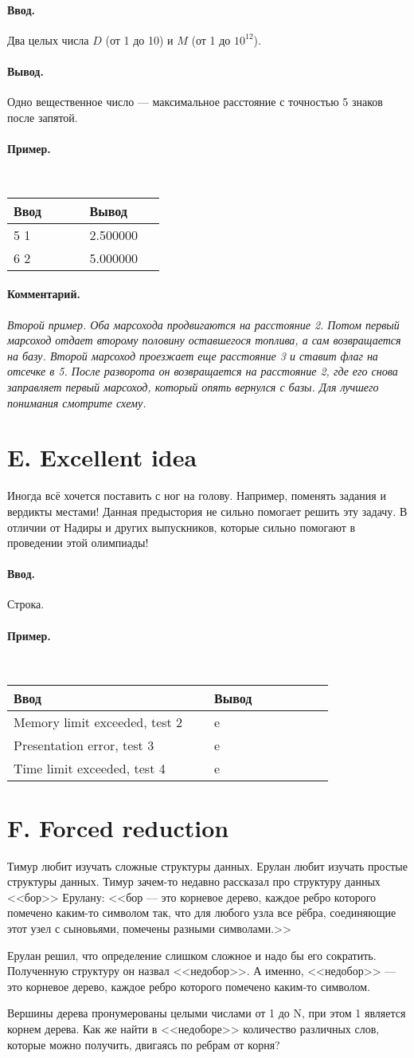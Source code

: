 \documentclass[10pt, a5paper]{article}
\newcommand{\informat}[1]
{
	\paragraph{Ввод.\\} #1
}
\newcommand{\outformat}[1]
{
	\paragraph{Вывод.\\} #1
}
\newcommand{\examplee}[4]
{
	\paragraph{Пример.\\}
	{\tt
	\begin{tabular}{|p{0.4\linewidth}|p{0.4\linewidth}|}
	\hline
	Ввод 	& Вывод  	\\
	\hline
	#1 		& #2 		\\
	\hline
	#3		& #4		\\
	\hline
	\end{tabular}
	}
}
\newcommand{\examplEEE}[6]
{
	\paragraph{Пример.\\}
	{\tt
	\begin{tabular}{|p{0.5\linewidth}|p{0.3\linewidth}|}
	\hline
	Ввод 	& Вывод  	\\
	\hline
	#1 		& #2 		\\
	\hline
	#3		& #4		\\
	\hline
	#5		& #6		\\
	\hline
	\end{tabular}
	}
}
\newcommand{\excomm}[1]
{
	\paragraph{Комментарий. \\}
	\textit{#1}
}
\begin{document}
\informat{Два целых числа $D$ (от 1 до 10) и $M$ (от 1 до $10^{12}$).}

\outformat{Одно вещественное число --- максимальное расстояние с точностью 5 знаков после запятой.}

\examplee{5 1}{2.500000}{6 2}{5.000000}

\excomm{Второй пример. Оба марсохода продвигаются на расстояние 2. Потом первый марсоход отдает второму половину оставшегося топлива, а сам возвращается на базу. Второй марсоход проезжает еще расстояние 3 и ставит флаг на отсечке в 5. После разворота он возвращается на расстояние 2, где его снова заправляет первый марсоход, который опять вернулся с базы. Для лучшего понимания смотрите схему.}





\section*{E. Excellent idea}
 


Иногда всё хочется поставить с ног на голову. Например, поменять задания и вердикты местами! Данная предыстория не сильно помогает решить эту задачу. В отличии от Надиры и других выпускников, которые сильно помогают в проведении этой олимпиады!

\informat{Строка.}

\examplEEE{Memory limit exceeded, test 2}{e}{Presentation error, test 3}{e}{Time limit exceeded, test 4}{e}




\section*{F. Forced reduction}
 

Тимур любит изучать сложные структуры данных. Ерулан любит изучать простые структуры данных. Тимур зачем-то недавно рассказал про структуру данных <<бор>> Ерулану: <<бор --- это корневое дерево, каждое ребро которого помечено каким-то символом так, что для любого узла все рёбра, соединяющие этот узел с сыновьями, помечены разными символами.>>

Ерулан решил, что определение слишком сложное и надо бы его сократить. Полученную структуру он назвал <<недобор>>. А именно, <<недобор>> --- это корневое дерево, каждое ребро которого помечено каким-то символом.

Вершины дерева пронумерованы целыми числами от 1 до N, при этом 1 является корнем дерева. Как же найти в <<недоборе>> количество различных слов, которые можно получить, двигаясь по ребрам от корня? 
\end{document}
